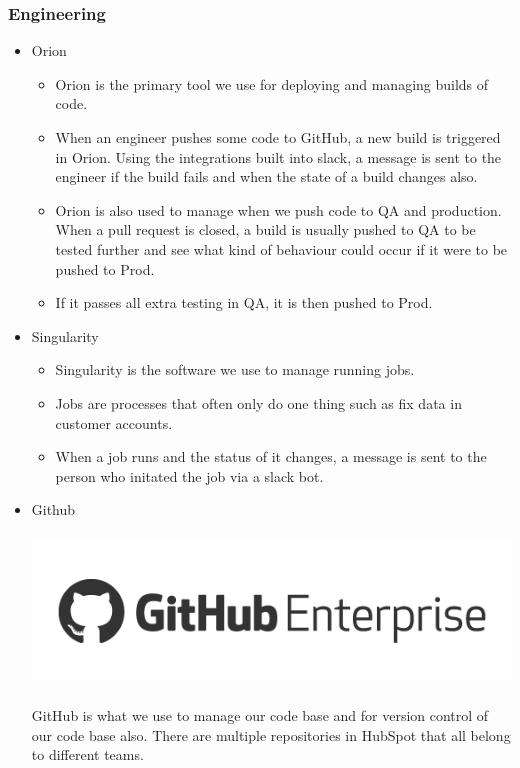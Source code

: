 \documentclass[11pt]{article} %
\begin{document}
\subsubsection{\textbf{Engineering}}
\begin{itemize}
\item Orion
\begin{itemize}
\item Orion is the primary tool we use for deploying and managing builds of code. 
\item When an engineer pushes some code to GitHub,  a new build is triggered in Orion.  Using the integrations built into slack,  a message is sent to the engineer if the build fails and when the state of a build changes also.
\item Orion is also used to manage when we push code to QA and production.  When a pull request is closed,  a build is usually pushed to QA to be tested further and see what kind of behaviour could occur if it were to be pushed to Prod. 
\item If it passes all extra testing in QA,  it is then pushed to Prod. 
\end{itemize}
\item Singularity
\begin{itemize}
\item Singularity is the software we use to manage running jobs. 
\item Jobs are processes that often only do one thing such as fix data in customer accounts.
\item When a job runs and the status of it changes,  a message is sent to the person who initated the job via a slack bot. 
\end{itemize}
\item Github \\\\
\includegraphics[scale=0.2]{github.png}\\\\
GitHub is what we use to manage our code base and for version control of our code base also.  There are multiple repositories in HubSpot that all belong to different teams. 
\end{itemize}
\end{document}
